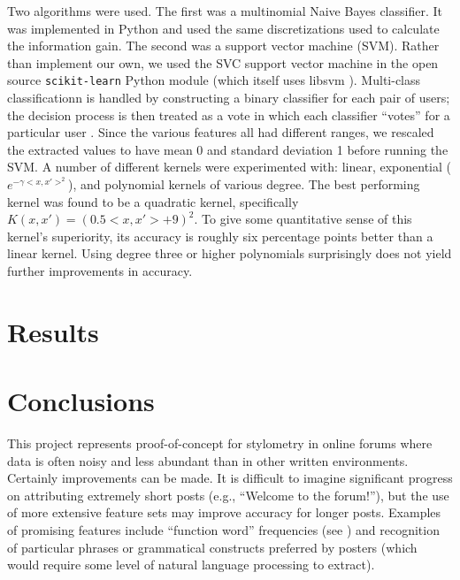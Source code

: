 \documentclass[12pt,letterpaper,onecolumn,oneside]{article}
\numberwithin{equation}{section}
\numberwithin{figure}{section}
\begin{document}
Two algorithms were used. The first was a multinomial Naive Bayes classifier. It was implemented in Python and used the same discretizations used to calculate the information gain. The second was a support vector 
machine (SVM). Rather than implement our own, we used the SVC support vector machine in the open source \verb+scikit-learn+ \cite{scikit-learn} Python module (which itself uses libsvm \cite{libsvm}). 
Multi-class classificationn is handled by constructing a binary classifier for each pair of users; the decision process is then treated as a vote in which each classifier ``votes'' for a particular user 
\cite{libsvm}. Since the various features all had different ranges, we rescaled the extracted values to have mean 0 and standard deviation 1 before running the SVM. A number of different kernels were experimented 
with: linear, exponential (\(e^{-\gamma <x,x'>^2}\)), and polynomial kernels of various degree. The best performing kernel was found to be a quadratic kernel, specifically \(K(x,x') = (0.5<x,x'>+9)^2\). To give 
some quantitative sense of this kernel's superiority, its accuracy is roughly six percentage points better than a linear kernel. Using degree three or higher polynomials surprisingly does not yield further 
improvements in accuracy.

\section{Results}

\section{Conclusions}
This project represents proof-of-concept for stylometry in online forums where data is often noisy and less abundant than in other written environments. Certainly improvements can be made. It is difficult to 
imagine significant progress on attributing extremely short posts (e.g., ``Welcome to the forum!''), but the use of more extensive feature sets may improve accuracy for longer posts. Examples of promising features 
include ``function word'' frequencies (see \cite{stanford}) and recognition of particular phrases or grammatical constructs preferred by posters (which would require some level of natural language processing to 
extract). 
\end{document}
